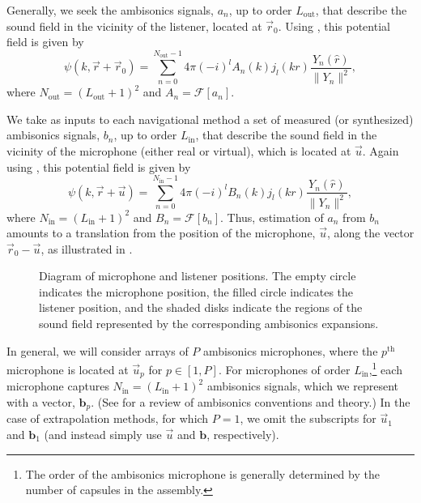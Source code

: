Generally, we seek the ambisonics signals, $a_n$, up to order $L_\text{out}$, that describe the sound field in the vicinity of the listener, located at $\vec{r}_0$.
Using , this potential field is given by
\begin{equation}\label{eq:03_Navigation_Techniques:Output_Potential_Field}
\psi(k,\vec{r} + \vec{r}_0) = \sum_{n=0}^{N_\text{out} - 1} 4\pi (-i)^l A_n(k) j_l(kr) \frac{Y_n(\hat{r})}{\|Y_n\|^2} ,
\end{equation}
where $N_\text{out} = (L_\text{out} + 1)^2$ and $A_n = \mathcal{F} \left[ a_n \right]$.

We take as inputs to each navigational method a set of measured (or synthesized) ambisonics signals, $b_n$, up to order $L_\text{in}$, that describe the sound field in the vicinity of the microphone (either real or virtual), which is located at $\vec{u}$.
Again using , this potential field is given by
\begin{equation}\label{eq:03_Navigation_Techniques:Input_Potential_Field}
\psi(k,\vec{r} + \vec{u}) = \sum_{n=0}^{N_\text{in} - 1} 4\pi (-i)^l B_n(k) j_l(kr) \frac{Y_n(\hat{r})}{\|Y_n\|^2} ,
\end{equation}
where $N_\text{in} = (L_\text{in} + 1)^2$ and $B_n = \mathcal{F} \left[ b_n \right]$.
Thus, estimation of $a_n$ from $b_n$ amounts to a translation from the position of the microphone, $\vec{u}$, along the vector $\vec{r}_0 - \vec{u}$, as illustrated in .

\begin{figure}[t]
\centering
  
  \caption[Diagram of microphone and listener positions.]{
  Diagram of microphone and listener positions.
  The empty circle indicates the microphone position,
  the filled circle indicates the listener position, and
  the shaded disks indicate the regions of the sound field represented by the corresponding ambisonics expansions.}
  \label{fig:03_Navigation_Techniques:Problem_Formulation}
\end{figure}

In general, we will consider arrays of $P$ ambisonics microphones, where the $p^\text{th}$ microphone is located at $\vec{u}_p$ for $p \in [1,P]$.
For microphones of order $L_\text{in}$,\footnote{The order of the ambisonics microphone is generally determined by the number of capsules in the assembly.} each microphone captures $N_\text{in} = (L_\text{in} + 1)^2$ ambisonics signals, which we represent with a vector, $\mathbf{b}_p$.
(See  for a review of ambisonics conventions and theory.)
In the case of extrapolation methods, for which $P = 1$, we omit the subscripts for $\vec{u}_1$ and $\mathbf{b}_1$ (and instead simply use $\vec{u}$ and $\mathbf{b}$, respectively).

